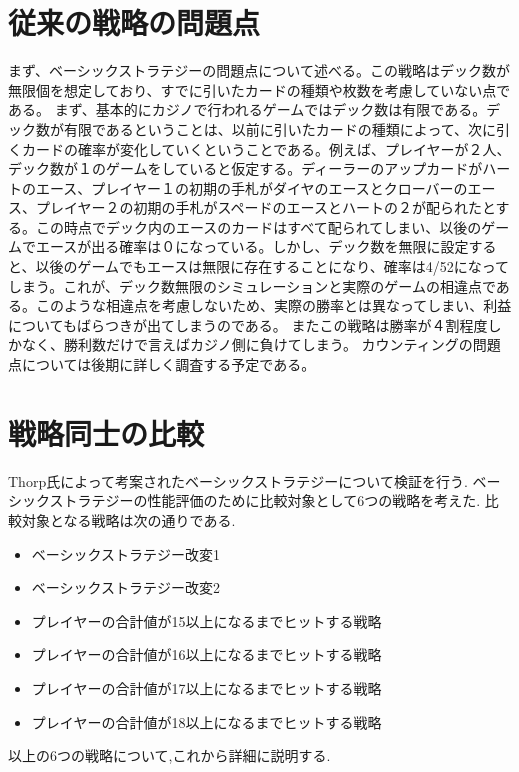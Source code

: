 \section{従来の戦略の問題点}
まず、ベーシックストラテジーの問題点について述べる。この戦略はデック数が無限個を想定しており、すでに引いたカードの種類や枚数を考慮していない点である。
まず、基本的にカジノで行われるゲームではデック数は有限である。デック数が有限であるということは、以前に引いたカードの種類によって、次に引くカードの確率が変化していくということである。例えば、プレイヤーが２人、デック数が１のゲームをしていると仮定する。ディーラーのアップカードがハートのエース、プレイヤー１の初期の手札がダイヤのエースとクローバーのエース、プレイヤー２の初期の手札がスペードのエースとハートの２が配られたとする。この時点でデック内のエースのカードはすべて配られてしまい、以後のゲームでエースが出る確率は０になっている。しかし、デック数を無限に設定すると、以後のゲームでもエースは無限に存在することになり、確率は4/52になってしまう。これが、デック数無限のシミュレーションと実際のゲームの相違点である。このような相違点を考慮しないため、実際の勝率とは異なってしまい、利益についてもばらつきが出てしまうのである。
またこの戦略は勝率が４割程度しかなく、勝利数だけで言えばカジノ側に負けてしまう。
カウンティングの問題点については後期に詳しく調査する予定である。

\section{戦略同士の比較}
Thorp氏によって考案されたベーシックストラテジーについて検証を行う.
ベーシックストラテジーの性能評価のために比較対象として6つの戦略を考えた.
比較対象となる戦略は次の通りである.

\begin{itemize}
  \item ベーシックストラテジー改変1
  \item ベーシックストラテジー改変2
  \item プレイヤーの合計値が15以上になるまでヒットする戦略
  \item プレイヤーの合計値が16以上になるまでヒットする戦略
  \item プレイヤーの合計値が17以上になるまでヒットする戦略
  \item プレイヤーの合計値が18以上になるまでヒットする戦略
\end{itemize}

以上の6つの戦略について,これから詳細に説明する.

